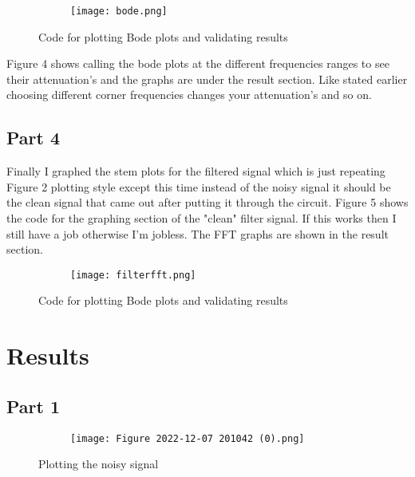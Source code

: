 \documentclass[12pt,a4paper]{article}
\begin{document}
\begin{figure}[h]
\centering
\begin{subfigure}{ 1\textwidth}
\texttt{[image: bode.png]}
\end{subfigure}
\caption{ Code for plotting Bode plots and validating results}
\label{fig2:image22}
\end{figure}

\clearpage
Figure 4 shows calling the bode plots at the different frequencies ranges to see their attenuation's and the graphs are under the result section. Like stated earlier choosing different corner frequencies changes your attenuation's and so on.



\subsection{Part 4}
Finally I graphed the stem plots for the filtered signal which is just repeating Figure 2 plotting style except this time instead of the noisy signal it should be the clean signal that came out after putting it through the circuit. Figure 5 shows the code for the graphing section of the "clean" filter signal. If this works then I still have a job otherwise I'm jobless. The FFT graphs are shown in the result section.

\begin{figure}[h]
\centering
\begin{subfigure}{ 1\textwidth}
\texttt{[image: filterfft.png]}
\end{subfigure}
\caption{ Code for plotting Bode plots and validating results}
\label{fig2:image22}
\end{figure}
\clearpage


\section{Results}\label{sec:res}

\subsection{Part 1}

\begin{figure}[h]
\centering
\begin{subfigure}{ 1\textwidth}
\texttt{[image: Figure 2022-12-07 201042 (0).png]}
\end{subfigure}
\caption{ Plotting the noisy signal  }
\label{fig2:image22}
\end{figure}
\end{document}
